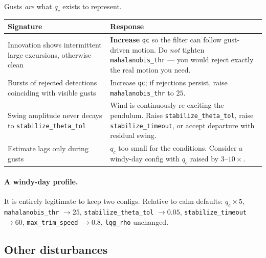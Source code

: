 \documentclass[11pt,a4paper]{article}
\newcommand{\param}[1]{\texttt{\small #1}}
\begin{document}
Gusts \emph{are} what $q_c$ exists to represent.

\begin{center}
\begin{tabular}{@{}p{6.2cm}p{8.4cm}@{}}
\toprule
\textbf{Signature} & \textbf{Response} \\
\midrule
Innovation shows intermittent large excursions, otherwise clean
& \textbf{Increase} \param{qc} so the filter can follow gust-driven motion. Do
\emph{not} tighten \param{mahalanobis\_thr} --- you would reject exactly the
real motion you need. \\
Bursts of rejected detections coinciding with visible gusts
& Increase \param{qc}; if rejections persist, raise
\param{mahalanobis\_thr} to $25$. \\
Swing amplitude never decays to \param{stabilize\_theta\_tol}
& Wind is continuously re-exciting the pendulum. Raise
\param{stabilize\_theta\_tol}, raise \param{stabilize\_timeout}, or accept
departure with residual swing. \\
Estimate lags only during gusts
& $q_c$ too small for the conditions. Consider a windy-day config with
$q_c$ raised by $3$--$10\times$. \\
\bottomrule
\end{tabular}
\end{center}

\paragraph{A windy-day profile.} It is entirely legitimate to keep two configs.
Relative to calm defaults: $q_c\times5$, \param{mahalanobis\_thr} $\to25$,
\param{stabilize\_theta\_tol} $\to0.05$, \param{stabilize\_timeout} $\to60$,
\param{max\_trim\_speed} $\to0.8$, \param{lqg\_rho} unchanged.

\subsection{Other disturbances}
\end{document}
